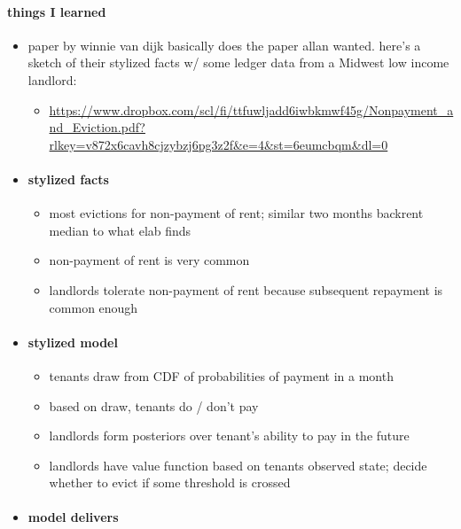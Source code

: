 \paragraph{things I learned}
\begin{itemize}
    \item paper by winnie van dijk basically does the paper allan wanted. here's a sketch of their stylized facts w/ some ledger data from a Midwest low income landlord: 
    \begin{itemize}
        \item \url{https://www.dropbox.com/scl/fi/ttfuwljadd6iwbkmwf45g/Nonpayment_and_Eviction.pdf?rlkey=v872x6cavh8cjzybzj6pg3z2f&e=4&st=6eumcbqm&dl=0}
    \end{itemize}
    
    \item \paragraph{stylized facts}
    \begin{itemize}
        \item most evictions for non-payment of rent; similar two months backrent median to what elab finds
        \item non-payment of rent is very common
        \item landlords tolerate non-payment of rent because subsequent repayment is common enough
    \end{itemize}
    \item \paragraph{stylized model}
    \begin{itemize}
        \item tenants draw from CDF of probabilities of payment in a month
        \item based on draw, tenants do / don't pay
        \item landlords form posteriors over tenant's ability to pay in the future
        \item landlords have value function based on tenants observed state;  decide whether to evict if some threshold is crossed
    \end{itemize}
    \item \paragraph{model delivers}

\end{itemize}
